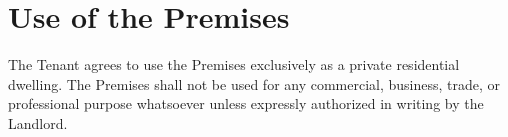 
\section{Use of the Premises}
\label{sec:usage}

The Tenant agrees to use the Premises exclusively as a private residential dwelling. The Premises shall not be used for any commercial, business, trade, or professional purpose whatsoever unless expressly authorized in writing by the Landlord.

